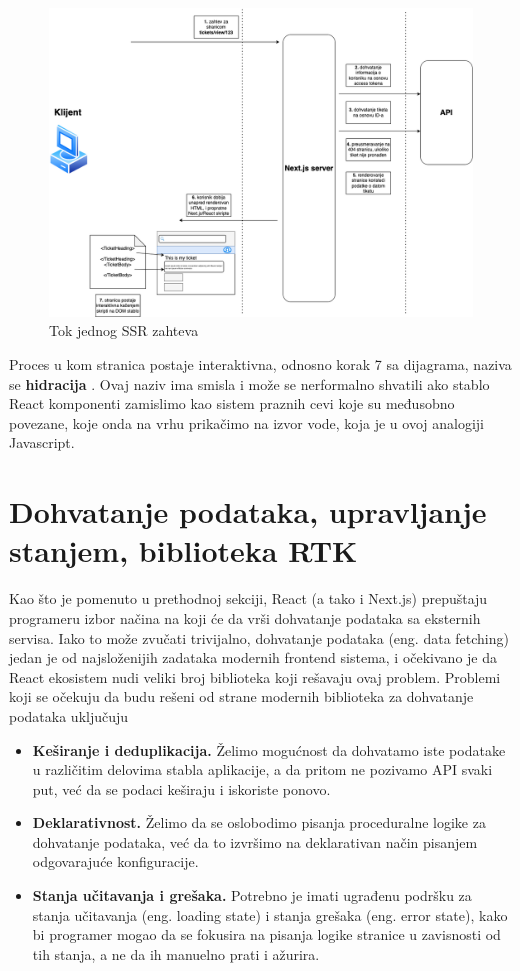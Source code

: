 \documentclass[12pt,oneside]{memoir}
\begin{document}
\begin{figure}[h]
  \centering
  \includegraphics[width=1\textwidth]{docs/images/ch_4/nextjs_flow.png} 
  \caption{Tok jednog SSR zahteva}
  \label{fig:sample}
\end{figure}

Proces u kom stranica postaje interaktivna, odnosno korak 7 sa dijagrama, naziva se \textbf{hidracija} \cite{reactdocscomponents}. Ovaj naziv ima smisla i može se nerformalno shvatili ako stablo React komponenti zamislimo kao sistem praznih cevi koje su međusobno povezane, koje onda na vrhu prikačimo na izvor vode, koja je u ovoj analogiji Javascript.

\newpage
\section{Dohvatanje podataka, upravljanje stanjem, biblioteka RTK}

Kao što je pomenuto u prethodnoj sekciji, React (a tako i Next.js) prepuštaju programeru izbor načina na koji će da vrši dohvatanje podataka sa eksternih servisa. Iako to može zvučati trivijalno, dohvatanje podataka (eng. data fetching) jedan je od najsloženijih zadataka modernih frontend sistema, i očekivano je da React ekosistem nudi veliki broj biblioteka koji rešavaju ovaj problem. Problemi koji se očekuju da budu rešeni od strane modernih biblioteka za dohvatanje podataka uključuju

\begin{itemize}
    \item \textbf{Keširanje i deduplikacija.} Želimo mogućnost da dohvatamo iste podatake u različitim delovima stabla aplikacije, a da pritom ne pozivamo API svaki put, već da se podaci keširaju i iskoriste ponovo.
    \item \textbf{Deklarativnost.} Želimo da se oslobodimo pisanja proceduralne logike za dohvatanje podataka, već da to izvršimo na deklarativan način pisanjem odgovarajuće konfiguracije.
    \item \textbf{Stanja učitavanja i grešaka.} Potrebno je imati ugrađenu podršku za stanja učitavanja (eng. loading state) i stanja grešaka (eng. error state), kako bi programer mogao da se fokusira na pisanja logike stranice u zavisnosti od tih stanja, a ne da ih manuelno prati i ažurira.
\end{itemize}
\end{document}
